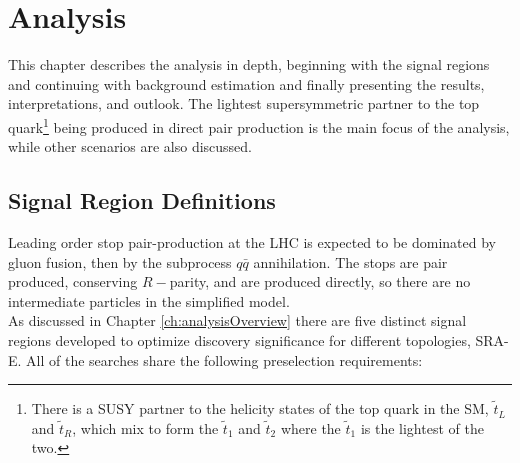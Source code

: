\chapter{Analysis}
\label{ch:analysis}



This chapter describes the analysis in depth, beginning with the signal regions and continuing with background estimation and finally presenting the results, interpretations, and outlook.  The lightest supersymmetric partner to the top quark\footnote{There is a SUSY partner to the helicity states of the top quark in the SM, $\tilde{t}_{L}$ and $\tilde{t}_{R}$, which mix to form the $\tilde{t}_{1}$ and $\tilde{t}_{2}$ where the $\tilde{t}_{1}$ is the lightest of the two.} being produced in direct pair production is the main focus of the analysis, while other scenarios are also discussed.  




\section{Signal Region Definitions}
\label{sec:srDefs}

Leading order stop pair-production at the LHC is expected to be dominated by gluon fusion, then by the subprocess $q\bar{q}$ annihilation.  The stops are pair produced, conserving $R-$parity, and are produced directly, so there are no intermediate particles in the simplified model.  \\

As discussed in Chapter \ref{ch:analysisOverview} there are five distinct signal regions developed to optimize discovery significance for different topologies, SRA-E.  All of the searches share the following preselection requirements:

